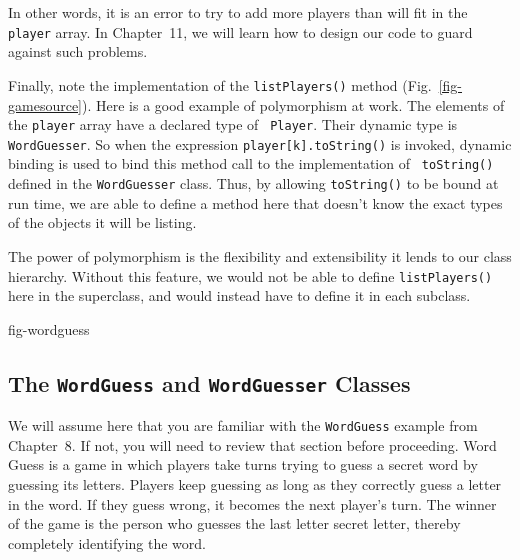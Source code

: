 \noindent In other words, it is an error to try to add more players
than will fit in the {\tt player} array. In Chapter~11, we will learn
how to design our code to guard against such problems. 

Finally, note the implementation of the {\tt listPlayers()} method
(Fig.~\ref{fig-gamesource}).
\noindent Here is a good example of polymorphism at work. The
elements of the {\tt player} array have a declared type of {\tt
Player}. Their dynamic type is {\tt WordGuesser}. So when the
expression {\tt player[k].toString()} is invoked, dynamic binding is
used to bind this method call to the implementation of {\tt
toString()} defined in the {\tt WordGuesser} class.  Thus, by
allowing {\tt toString()} to be bound at run time, we are able
to define a method here that doesn't know the exact types of the
objects it will be listing.

The power of polymorphism is the flexibility and extensibility it
lends to our class hierarchy.  Without this feature, we would not be
able to define {\tt listPlayers()} here in the superclass, and would
instead have to define it in each subclass.  


{fig-wordguess}

\subsection{The {\tt WordGuess} and {\tt WordGuesser} Classes}

We will assume here that you are familiar with the {\tt WordGuess}
example from Chapter~8. If not, you will need to review that section
before proceeding.  Word Guess is a game in which players take turns
trying to guess a secret word by guessing its letters. Players keep
guessing as long as they correctly guess a letter in the word. If they
guess wrong, it becomes the next player's turn. The winner of the game
is the person who guesses the last letter secret letter, thereby
completely identifying the word. 

